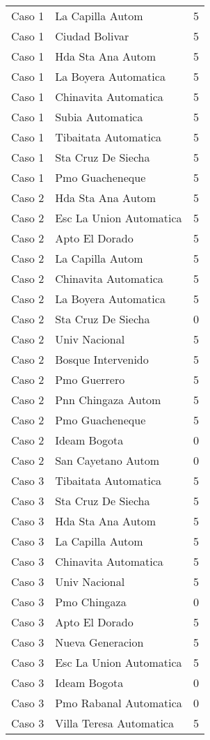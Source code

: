 \begin{longtable}{lll}
Caso 1 & La Capilla Autom  & 5\\
Caso 1 & Ciudad Bolivar  & 5\\
Caso 1 & Hda Sta Ana Autom  & 5\\
Caso 1 & La Boyera Automatica  & 5\\
Caso 1 & Chinavita Automatica  & 5\\
Caso 1 & Subia Automatica  & 5\\
Caso 1 & Tibaitata Automatica  & 5\\
Caso 1 & Sta Cruz De Siecha  & 5\\
Caso 1 & Pmo Guacheneque  & 5\\
Caso 2 & Hda Sta Ana Autom  & 5\\
Caso 2 & Esc La Union Automatica & 5\\
Caso 2 & Apto El Dorado  & 5\\
Caso 2 & La Capilla Autom  & 5\\
Caso 2 & Chinavita Automatica  & 5\\
Caso 2 & La Boyera Automatica  & 5\\
Caso 2 & Sta Cruz De Siecha  & 0\\
Caso 2 & Univ Nacional  & 5\\
Caso 2 & Bosque Intervenido    & 5\\
Caso 2 & Pmo Guerrero  & 5\\
Caso 2 & Pnn Chingaza Autom   & 5\\
Caso 2 & Pmo Guacheneque  & 5\\
Caso 2 & Ideam Bogota  & 0\\
Caso 2 & San Cayetano Autom   & 0\\
Caso 3 & Tibaitata Automatica  & 5\\
Caso 3 & Sta Cruz De Siecha  & 5\\
Caso 3 & Hda Sta Ana Autom  & 5\\
Caso 3 & La Capilla Autom  & 5\\
Caso 3 & Chinavita Automatica  & 5\\
Caso 3 & Univ Nacional  & 5\\
Caso 3 & Pmo Chingaza  & 0\\
Caso 3 & Apto El Dorado  & 5\\
Caso 3 & Nueva Generacion  & 5\\
Caso 3 & Esc La Union Automatica & 5\\
Caso 3 & Ideam Bogota  & 0\\
Caso 3 & Pmo Rabanal Automatica   & 0\\
Caso 3 & Villa Teresa Automatica  & 5\\

\end{longtable}
